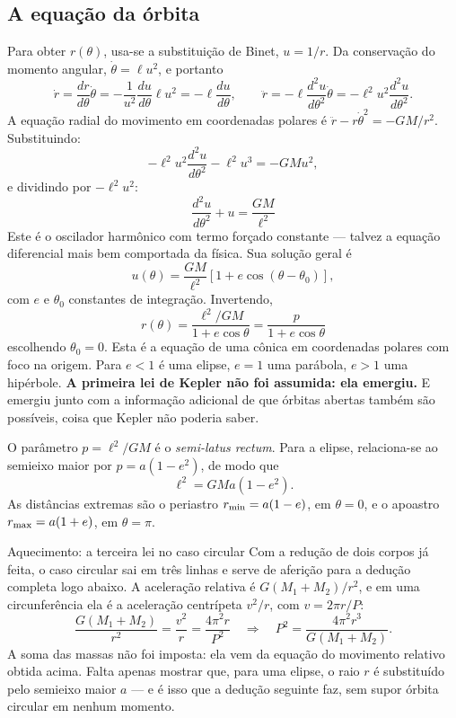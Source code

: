 \documentclass[11pt,a4paper]{article}
\begin{document}
\subsection*{A equação da órbita}

Para obter $r(\theta)$, usa-se a substituição de Binet, $u=1/r$. Da conservação do momento angular, $\dot{\theta}=\ell u^{2}$, e portanto
\[
\dot{r}=\frac{dr}{d\theta}\dot{\theta}=-\frac{1}{u^{2}}\frac{du}{d\theta}\ell u^{2}=-\ell\frac{du}{d\theta},
\qquad
\ddot{r}=-\ell\frac{d^{2}u}{d\theta^{2}}\dot{\theta}=-\ell^{2}u^{2}\frac{d^{2}u}{d\theta^{2}}.
\]
A equação radial do movimento em coordenadas polares é $\ddot{r}-r\dot{\theta}^{2}=-GM/r^{2}$. Substituindo:
\[
-\ell^{2}u^{2}\frac{d^{2}u}{d\theta^{2}}-\ell^{2}u^{3}=-GMu^{2},
\]
e dividindo por $-\ell^{2}u^{2}$:
\[
\boxed{\ \frac{d^{2}u}{d\theta^{2}}+u=\frac{GM}{\ell^{2}}\ }
\]
Este é o oscilador harmônico com termo forçado constante --- talvez a equação diferencial mais bem comportada da física. Sua solução geral é
\[
u(\theta)=\frac{GM}{\ell^{2}}\left[1+e\cos(\theta-\theta_0)\right],
\]
com $e$ e $\theta_0$ constantes de integração. Invertendo,
\[
\boxed{\ r(\theta)=\frac{\ell^{2}/GM}{1+e\cos\theta}=\frac{p}{1+e\cos\theta}\ }
\]
escolhendo $\theta_0=0$. Esta é a equação de uma cônica em coordenadas polares com foco na origem. Para $e<1$ é uma elipse, $e=1$ uma parábola, $e>1$ uma hipérbole. \textbf{A primeira lei de Kepler não foi assumida: ela emergiu.} E emergiu junto com a informação adicional de que órbitas abertas também são possíveis, coisa que Kepler não poderia saber.

O parâmetro $p=\ell^{2}/GM$ é o \textit{semi-latus rectum}. Para a elipse, relaciona-se ao semieixo maior por $p=a(1-e^{2})$, de modo que
\[
\ell^{2}=GMa(1-e^{2}).
\]
As distâncias extremas são o periastro $r_{\rm min}=a(1-e)$, em $\theta=0$, e o apoastro $r_{\rm max}=a(1+e)$, em $\theta=\pi$.

\begin{lessonblock}[borderline west={2pt}{0pt}{astroGold}]{Aquecimento: a terceira lei no caso circular}
Com a redução de dois corpos já feita, o caso circular sai em três linhas e serve de aferição para a dedução
completa logo abaixo. A aceleração relativa é $G(M_1+M_2)/r^{2}$, e em uma circunferência ela é a aceleração
centrípeta $v^{2}/r$, com $v=2\pi r/P$:
\[
\frac{G(M_1+M_2)}{r^2}=\frac{v^2}{r}=\frac{4\pi^2r}{P^2}
\quad\Longrightarrow\quad
P^2=\frac{4\pi^2r^3}{G(M_1+M_2)}.
\]
A soma das massas não foi imposta: ela vem da equação do movimento relativo obtida acima. Falta apenas mostrar
que, para uma elipse, o raio $r$ é substituído pelo semieixo maior $a$ --- e é isso que a dedução seguinte faz,
sem supor órbita circular em nenhum momento.
\end{lessonblock}
\end{document}
